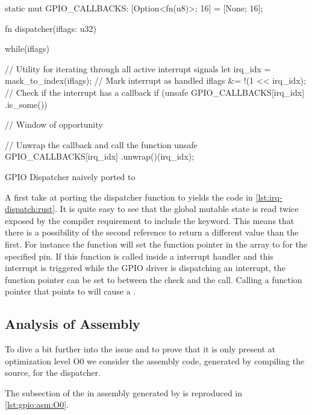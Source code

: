 \begin{listing}
  \begin{rustcode}
static mut GPIO_CALLBACKS: [Option<fn(u8)>; 16] = [None; 16];

fn dispatcher(iflags: u32) {
  while(iflags) {
    // Utility for iterating through all active interrupt signals
    let irq_idx = mask_to_index(iflags);
    // Mark interrupt as handled
    iflags &= !(1 << irq_idx);
    // Check if the interrupt has a callback
    if (unsafe { GPIO_CALLBACKS[irq_idx] }.is_some()) {

      // Window of opportunity

      // Unwrap the callback and call the function
      unsafe { GPIO_CALLBACKS[irq_idx] }.unwrap()(irq_idx);
    }
  }
}
  \end{rustcode}
  \caption{GPIO Dispatcher naively ported to {\rust}}
  \label{lst:irq-dispatch:rust}
\end{listing}

A first take at porting the dispatcher function to {\rust} yields the code in \autoref{lst:irq-dispatch:rust}.
It is quite easy to see that the global mutable state is read twice exposed by the compiler requirement to include the {\unsafe} keyword.
This means that there is a possibility of the second reference to return a different value than the first.
For instance the function  will set the function pointer in the array to  for the specified pin.
If this function is called inside a interrupt handler and this interrupt is triggered while the GPIO driver is dispatching an interrupt, the function pointer can be set to  between the check and the call.
Calling a function pointer that points to  will cause a .

\subsection{Analysis of Assembly}
To dive a bit further into the issue and to prove that it is only present at optimization level O0 we consider the assembly code, generated by compiling the {\C} source, for the dispatcher.

The subsection of the  in assembly generated by  is reproduced in \autoref{lst:gpio:asm:O0}.

